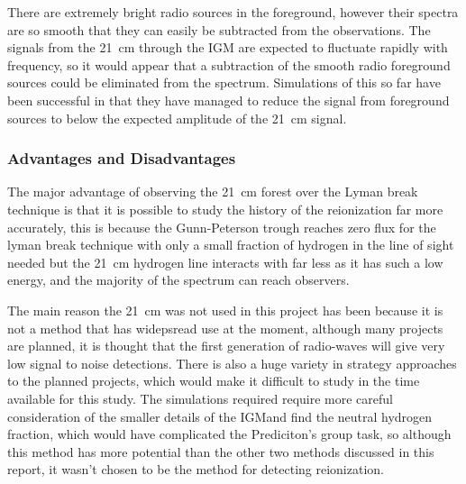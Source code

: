             There are extremely bright radio sources in the foreground, however their spectra are so smooth that they can easily be subtracted from the observations\cite{petrovic2011systematic}. The signals from the \SI{21}{\centi\metre} through the IGM are expected to fluctuate rapidly with frequency, so it would appear that a subtraction of the smooth radio foreground sources could be eliminated from the spectrum. Simulations of this so far have been successful in that they have managed to reduce the signal from foreground sources to below the expected amplitude of the \SI{21}{\centi\metre} signal\cite{liu2011method}.

        \subsubsection{Advantages and Disadvantages} %
    	\label{subsub:Advantages_disadvantages_21cm}
            The major advantage of observing the \SI{21}{\centi\metre} forest over the Lyman break technique is that it is possible to study the history of the reionization far more accurately, this is because the Gunn-Peterson trough reaches zero flux for the lyman break technique with only a small fraction of hydrogen in the line of sight needed  but the \SI{21}{\centi\metre} hydrogen line interacts with far less as it has such a low energy, and the majority of the spectrum can reach observers.

            The main reason the \SI{21}{\centi\metre} was not used in this project has been because it is not a method that has widepsread use at the moment, although many projects are planned, it is thought that the first generation of radio-waves will give very low signal to noise detections. There is also a huge variety in strategy approaches to the planned projects\cite{parsons2012sensitivity}, which would make it difficult to study in the time available for this study. The simulations required require more careful consideration of the smaller details of the IGMand find the neutral hydrogen fraction\cite{mcgreer2011first}, which would have complicated the Prediciton's group task, so although this method has more potential than the other two methods discussed in this report, it wasn't chosen to be the method for detecting reionization.

